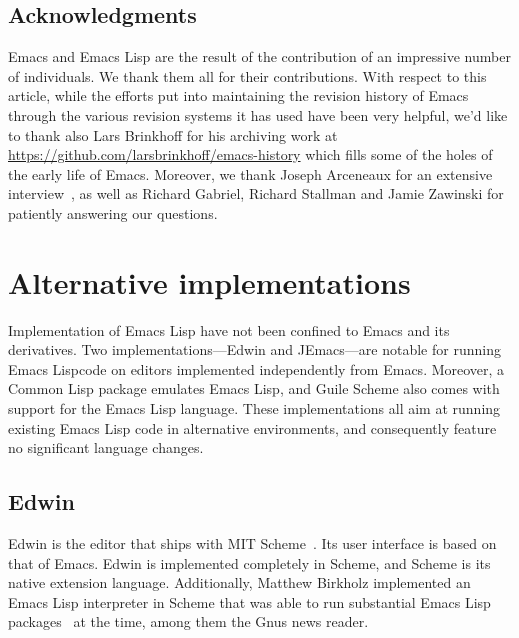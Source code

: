 \documentclass[format=acmsmall, review]{acmart}
\newcommand \Elisp {Emacs Lisp}
\begin{document}

\subsection{Acknowledgments}

Emacs and \Elisp{} are the result of the contribution of an impressive
number of individuals.  We thank them all for their contributions.
With respect to this article, while the efforts put into maintaining the
revision history of Emacs through the various revision systems it has used
have been very helpful, we'd like to thank also Lars Brinkhoff for his
archiving work at \url{https://github.com/larsbrinkhoff/emacs-history} which
fills some of the holes of the early life of Emacs.
Moreover, we thank Joseph Arceneaux for an extensive
interview~\cite{Arcenaux-interview}, as well as Richard Gabriel,
Richard Stallman and Jamie Zawinski for patiently answering our questions.

\appendix

\section{Alternative implementations}
\label{sec:alternative-implementations}

Implementation of \Elisp{} have not been confined to Emacs and its
derivatives.  Two imp\-lemen\-tations---Edwin and JEmacs---are notable for
running \Elisp code on editors implemented independently from Emacs.
Moreover, a Common Lisp package emulates Emacs Lisp, and Guile Scheme
also comes with support for the \Elisp{} language.
These implementations all aim at running existing \Elisp{}
code in alternative environments, and consequently feature no
significant language changes.

\subsection{Edwin}

Edwin is the editor that ships with MIT Scheme~\cite{MITScheme2014}.
Its user interface is based on that of Emacs.  Edwin is implemented
completely in Scheme, and Scheme is its native extension language.
Additionally, Matthew Birkholz implemented an \Elisp{} interpreter
in Scheme that was able to run substantial \Elisp{}
packages~\cite{Birkholz1993} at the time, among them the Gnus news reader.
\end{document}
